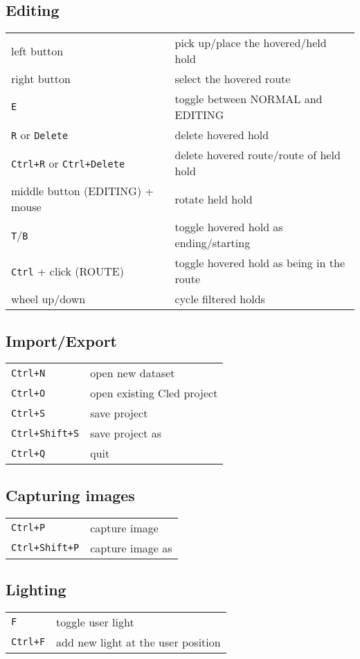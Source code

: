 \subsection{Editing}

\begin{tabular}[]{@{}ll@{}}
\toprule
left button & pick up/place the hovered/held hold \\
right button & select the hovered route \\
\verb|E| & toggle between NORMAL and EDITING \\
\verb|R| or \verb|Delete| & delete hovered hold \\
\verb|Ctrl+R| or \verb|Ctrl+Delete| & delete hovered route/route of held hold \\
middle button (EDITING) + mouse & rotate held hold \\
\verb|T|/\verb|B| & toggle hovered hold as ending/starting \\
\verb|Ctrl| + click (ROUTE) & toggle hovered hold as being in the route \\
wheel up/down & cycle filtered holds \\
\bottomrule
\end{tabular}

\subsection{Import/Export}

\begin{tabular}[]{@{}ll@{}}
\toprule
\verb|Ctrl+N| & open new dataset \\
\verb|Ctrl+O| & open existing Cled project \\
\verb|Ctrl+S| & save project \\
\verb|Ctrl+Shift+S| & save project as \\
\verb|Ctrl+Q| & quit \\
\bottomrule
\end{tabular}

\subsection{Capturing images}

\begin{tabular}[]{@{}ll@{}}
\toprule
\verb|Ctrl+P| & capture image \\
\verb|Ctrl+Shift+P| & capture image as \\
\bottomrule
\end{tabular}

\subsection{Lighting}

\begin{tabular}[]{@{}ll@{}}
\toprule
\verb|F| & toggle user light \\
\verb|Ctrl+F| & add new light at the user position \\
\bottomrule
\end{tabular}


